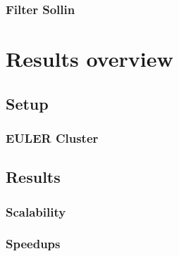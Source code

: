 \documentclass{beamer}
\begin{document}
\begin{frame}
\frametitle{Filter Sollin}

\end{frame}


\begin{frame}
    \printbibliography
\end{frame} 

\section{Results overview}

\subsection{Setup}

\begin{frame}
\frametitle{EULER Cluster}

\end{frame}

\subsection{Results}

\begin{frame}
\frametitle{Scalability}

\end{frame}

\begin{frame}
\frametitle{Speedups}

\end{frame}
\end{document}
